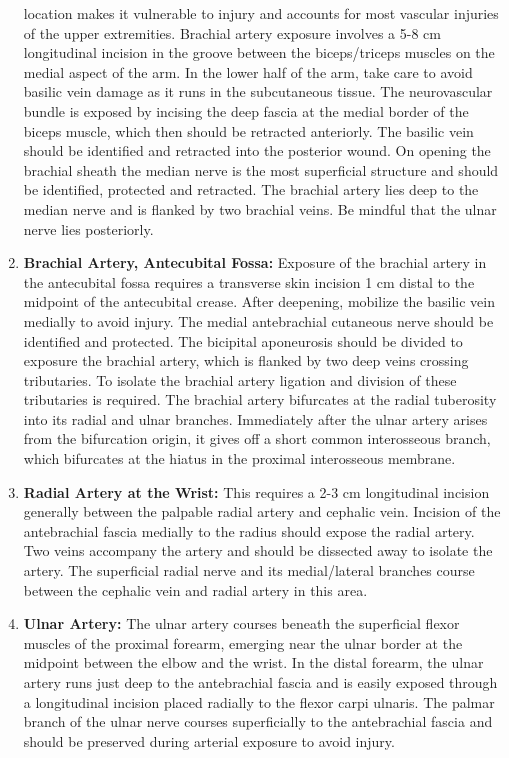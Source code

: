\documentclass[
]{book}
\begin{document}
\begin{enumerate}
  location makes it vulnerable to injury and accounts for most
  vascular injuries of the upper extremities. Brachial artery exposure
  involves a 5-8 cm longitudinal incision in the groove between the
  biceps/triceps muscles on the medial aspect of the arm. In the lower
  half of the arm, take care to avoid basilic vein damage as it runs
  in the subcutaneous tissue. The neurovascular bundle is exposed by
  incising the deep fascia at the medial border of the biceps muscle,
  which then should be retracted anteriorly. The basilic vein should
  be identified and retracted into the posterior wound. On opening the
  brachial sheath the median nerve is the most superficial structure
  and should be identified, protected and retracted. The brachial
  artery lies deep to the median nerve and is flanked by two brachial
  veins. Be mindful that the ulnar nerve lies posteriorly.
\item
  \textbf{Brachial Artery, Antecubital Fossa:} Exposure of the brachial
  artery in the antecubital fossa requires a transverse skin incision
  1 cm distal to the midpoint of the antecubital crease. After
  deepening, mobilize the basilic vein medially to avoid injury. The
  medial antebrachial cutaneous nerve should be identified and
  protected. The bicipital aponeurosis should be divided to exposure
  the brachial artery, which is flanked by two deep veins crossing
  tributaries. To isolate the brachial artery ligation and division of
  these tributaries is required. The brachial artery bifurcates at the
  radial tuberosity into its radial and ulnar branches. Immediately
  after the ulnar artery arises from the bifurcation origin, it gives
  off a short common interosseous branch, which bifurcates at the
  hiatus in the proximal interosseous membrane.
\item
  \textbf{Radial Artery at the Wrist:} This requires a 2-3 cm longitudinal
  incision generally between the palpable radial artery and cephalic
  vein. Incision of the antebrachial fascia medially to the radius
  should expose the radial artery. Two veins accompany the artery and
  should be dissected away to isolate the artery. The superficial
  radial nerve and its medial/lateral branches course between the
  cephalic vein and radial artery in this area.
\item
  \textbf{Ulnar Artery:} The ulnar artery courses beneath the superficial
  flexor muscles of the proximal forearm, emerging near the ulnar
  border at the midpoint between the elbow and the wrist. In the
  distal forearm, the ulnar artery runs just deep to the antebrachial
  fascia and is easily exposed through a longitudinal incision placed
  radially to the flexor carpi ulnaris. The palmar branch of the ulnar
  nerve courses superficially to the antebrachial fascia and should be
  preserved during arterial exposure to avoid injury.
\end{enumerate}
\end{document}
